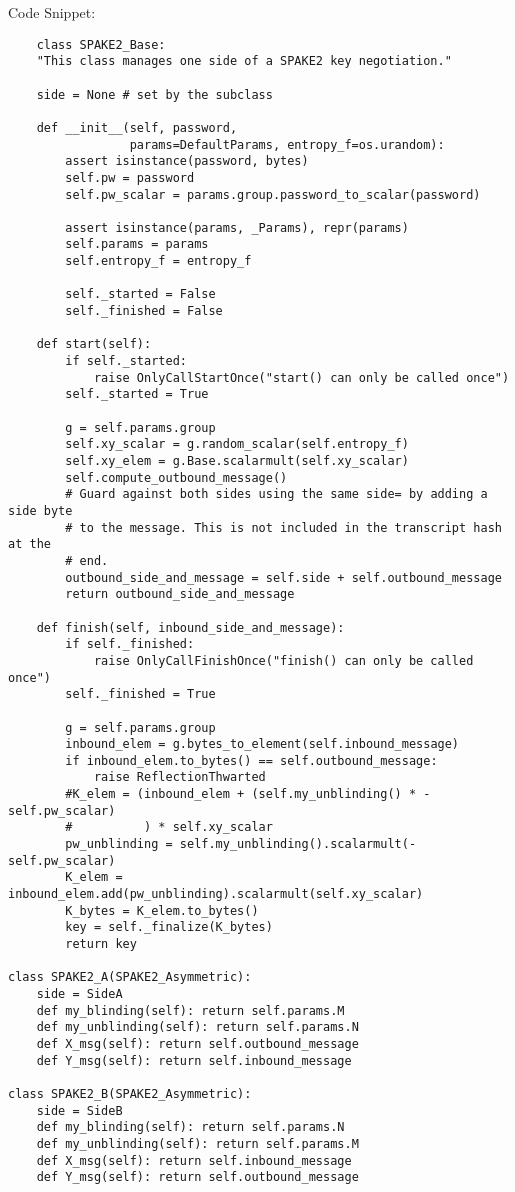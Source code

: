Code Snippet:
\begin{verbatim}
	class SPAKE2_Base:
    "This class manages one side of a SPAKE2 key negotiation."

    side = None # set by the subclass

    def __init__(self, password,
                 params=DefaultParams, entropy_f=os.urandom):
        assert isinstance(password, bytes)
        self.pw = password
        self.pw_scalar = params.group.password_to_scalar(password)

        assert isinstance(params, _Params), repr(params)
        self.params = params
        self.entropy_f = entropy_f

        self._started = False
        self._finished = False

    def start(self):
        if self._started:
            raise OnlyCallStartOnce("start() can only be called once")
        self._started = True

        g = self.params.group
        self.xy_scalar = g.random_scalar(self.entropy_f)
        self.xy_elem = g.Base.scalarmult(self.xy_scalar)
        self.compute_outbound_message()
        # Guard against both sides using the same side= by adding a side byte
        # to the message. This is not included in the transcript hash at the
        # end.
        outbound_side_and_message = self.side + self.outbound_message
        return outbound_side_and_message

    def finish(self, inbound_side_and_message):
        if self._finished:
            raise OnlyCallFinishOnce("finish() can only be called once")
        self._finished = True

        g = self.params.group
        inbound_elem = g.bytes_to_element(self.inbound_message)
        if inbound_elem.to_bytes() == self.outbound_message:
            raise ReflectionThwarted
        #K_elem = (inbound_elem + (self.my_unblinding() * -self.pw_scalar)
        #          ) * self.xy_scalar
        pw_unblinding = self.my_unblinding().scalarmult(-self.pw_scalar)
        K_elem = inbound_elem.add(pw_unblinding).scalarmult(self.xy_scalar)
        K_bytes = K_elem.to_bytes()
        key = self._finalize(K_bytes)
        return key

class SPAKE2_A(SPAKE2_Asymmetric):
	side = SideA
	def my_blinding(self): return self.params.M
	def my_unblinding(self): return self.params.N
	def X_msg(self): return self.outbound_message
	def Y_msg(self): return self.inbound_message

class SPAKE2_B(SPAKE2_Asymmetric):
	side = SideB
	def my_blinding(self): return self.params.N
	def my_unblinding(self): return self.params.M
	def X_msg(self): return self.inbound_message
	def Y_msg(self): return self.outbound_message
\end{verbatim}

